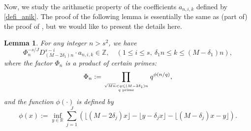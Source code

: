 \documentclass[12pt]{article}
\newtheorem{lemma}[theorem]{Lemma}
\numberwithin{equation}{section}
\begin{document}
\bigskip

Now, we study the arithmetic property of the coefficients $a_{n,i,k}$ defined by \eqref{defi_anik}. The proof of the following lemma is essentially the same as (part of) the proof of  \cite[Lemma 19]{Zud2004}, but we would like to present the details here.

\begin{lemma}\label{lem_arith_anik}
For any integer $n > s^2$, we have
\[ \Phi_n^{-s/J} D_{(M-2\delta_1)n}^{s-i} \cdot  a_{n,i,k} \in \mathbb{Z}, \quad (1 \leqslant i \leqslant s,~\delta_1n \leqslant k \leqslant (M-\delta_1)n),   \]
where the factor $\Phi_n$ is a product of certain primes:
\begin{equation}\label{defi_Phi}
\Phi_n := \prod_{\sqrt{Mn} < q \leqslant (M-2\delta_1)n \atop q \text{~prime}} q^{\phi(n/q)}, 
\end{equation}
and the function $\phi(\cdot)$ is defined by
\begin{equation}\label{defi_phi}
\phi(x) := \inf_{y \in \mathbb{R}} \sum_{j=1}^{J}  \left( \lfloor(M-2\delta_j)x\rfloor - \lfloor y-\delta_j x \rfloor - \lfloor (M-\delta_j)x - y \rfloor \right).
\end{equation}
\end{lemma}
\end{document}
